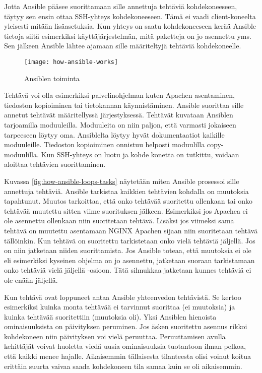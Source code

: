 Jotta Ansible pääsee suorittamaan sille annettuja tehtäviä kohdekoneeseen, täytyy sen ensin ottaa SSH-yhteys kohdekoneeseen. Tämä ei vaadi client-koneelta yleisesti mitään lisäasetuksia. Kun yhteys on saatu kohdekoneeseen kerää Ansible tietoja siitä esimerkiksi käyttäjärjestelmän, mitä paketteja on jo asennettu yms. Sen jälkeen Ansible lähtee ajamaan sille määriteltyjä tehtäviä kohdekoneelle.

\begin{figure}[h]
  \texttt{[image: how-ansible-works]}
  \caption{Ansiblen toiminta}
  \label{fig:how-ansible-works}
\end{figure}

Tehtävä voi olla esimerkiksi palvelinohjelman kuten Apachen asentaminen, tiedoston kopioiminen tai tietokannan käynnistäminen. Ansible suorittaa sille annetut tehtävät määritellyssä järjestyksessä. Tehtävät kuvataan Ansiblen tarjoamilla moduuleilla. Moduuleita on niin paljon, että varmasti jokaiseen tarpeeseen löytyy oma. Ansiblelta löytyy hyvät dokumentaatiot kaikille moduuleille. Tiedoston kopioiminen onnistuu helposti moduulilla copy-moduulilla. Kun SSH-yhteys on luotu ja kohde konetta on tutkittu, voidaan aloittaa tehtävien suorittaminen.

Kuvassa \ref{fig:how-ansible-loops-tasks} näytetään miten Ansible prosessoi sille annettuja tehtäviä. Ansible tarkistaa kaikkien tehtävien kohdalla on muutoksia tapahtunut. Muutos tarkoittaa, että onko tehtävää suoritettu ollenkaan tai onko tehtävää muutettu sitten viime suorituksen jälkeen. Esimerkiksi jos Apachea ei ole asennettu ollenkaan niin suoritetaan tehtävä. Lisäksi jos viimeksi sama tehtävä on muutettu asentamaan NGINX Apachen sijaan niin suoritetaan tehtävä tällöinkin. Kun tehtävä on suoritettu tarkistetaan onko vielä tehtäviä jäljellä. Jos on niin jatketaan niiden suorittamista. Jos Ansible toteaa, että muutoksia ei ole eli esimerkiksi kyseinen ohjelma on jo asennettu, jatketaan suoraan tarkistamaan onko tehtäviä vielä jäljellä -osioon. Tätä silmukkaa jatketaan kunnes tehtäviä ei ole enään jäljellä.

Kun tehtävä ovat loppuneet antaa Ansible yhteenvedon tehtävistä. Se kertoo esimerkiksi kuinka monta tehtävää ei tarvinnut suorittaa (ei muutoksia) ja kuinka tehtävää suoritettiin (muutoksia oli). Yksi Ansiblen hienoista ominaisuuksista on päivityksen peruminen. Jos äsken suoritettu asennus rikkoi kohdekoneen niin päivityksen voi vielä peruuttaa. Peruuttamisen avulla kehittäjät voivat huoletta viedä uusia ominaisuuksia tuotantoon ilman pelkoa, että kaikki menee hajalle. Aikaisemmin tällaisesta tilanteesta olisi voinut koitua erittäin suurta vaivaa saada kohdekoneen tila samaa kuin se oli aikaisemmin.

